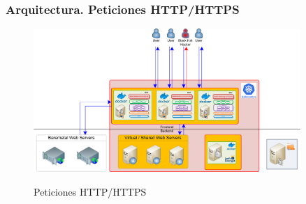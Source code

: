 \begin{frame}[shrink]
  \frametitle{Arquitectura. Peticiones HTTP/HTTPS}
  \begin{figure}
    \includegraphics[width=0.9\textwidth]{fig/Diagram_HTTP_Services}
    \label{fig:Diagram_HTTP_Services}
    \caption{Peticiones HTTP/HTTPS}
  \end{figure}
\end{frame}

